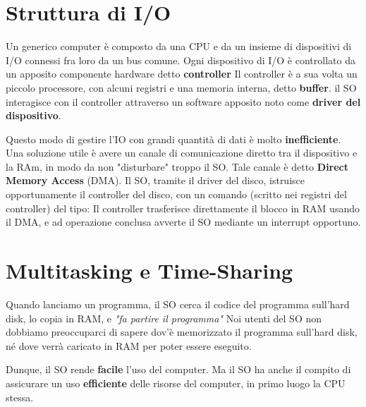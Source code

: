 \section{Struttura di I/O}
Un generico computer è composto da una CPU e da un insieme di dispositivi di I/O connessi fra loro da un bus comune.
Ogni dispositivo di I/O è controllato da un apposito componente hardware detto \textbf{controller}
Il controller è a sua volta un piccolo processore, con alcuni registri e una memoria interna, detto \textbf{buffer}.
il SO interagisce con il controller attraverso un software apposito noto come \textbf{driver del dispositivo}.

Questo modo di gestire l'IO con grandi quantità di dati è molto \textbf{inefficiente}.
Una soluzione utile è avere un canale di comunicazione diretto tra il dispositivo e la RAm, in modo da non "disturbare" troppo il SO.
Tale canale è detto \textbf{Direct Memory Access} (DMA).
Il SO, tramite il driver del disco, istruisce opportunamente il controller del disco, con un comando (scritto nei registri del controller) del tipo:
Il controller trasferisce direttamente il blocco in RAM usando il DMA, e ad operazione conclusa avverte il SO mediante un interrupt opportuno.


\section{Multitasking e Time-Sharing}
Quando lanciamo un programma, il SO cerca il codice del programma sull’hard disk, lo copia in RAM, e \textit{"fa partire il programma"}
Noi utenti del SO non dobbiamo preoccuparci di sapere dov’è memorizzato il programma sull’hard disk, né dove verrà caricato in RAM per poter essere eseguito.

Dunque, il SO rende \textbf{facile} l’uso del computer. Ma il SO ha anche il compito di assicurare un uso \textbf{efficiente} delle risorse del computer, in primo luogo la CPU stessa.

